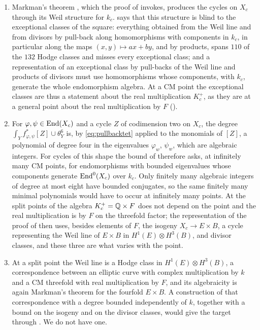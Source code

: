 \begin{remark}\label{rem:cmsource}
\leavevmode
\begin{enumerate}[label=\textup{(\arabic*)},leftmargin=2.6em,itemsep=3pt]
\item Markman's theorem \cite{Mar25a}, which the proof of
   invokes, produces the cycles on $X_{c}$ through its
  Weil structure for $k_{c}$.  says that this structure
  is blind to the exceptional classes of the square: everything obtained
  from the Weil line and from divisors by pull-back along homomorphisms with
  components in $k_{c}$, in particular along the maps $(x,y)\mapsto ax+by$,
  and by products, spans $110$ of the $132$ Hodge classes and misses every
  exceptional class; and a representation of an exceptional class by
  pull-backs of the Weil line and products of divisors must use
  homomorphisms whose components, with $k_{c}$, generate the whole
  endomorphism algebra. At a CM point the exceptional classes are thus a
  statement about the real multiplication $K_{c}^{+}$, as they are at a
  general point about the real multiplication by $F$
  ().
\item For $\varphi,\psi\in\operatorname{End}(X_{c})$ and a cycle $Z$ of codimension two on
  $X_{c}$, the degree $\int_{Y}f_{\varphi,\psi}^{*}[Z]\cup\theta_{Y}^{6}$
  is, by \eqref{eq:pullbacktet} applied to the monomials of $[Z]$, a
  polynomial of degree four in the eigenvalues $\varphi_{w}$, $\psi_{w}$,
  which are algebraic integers. For cycles of this shape the bound of
   therefore asks, at infinitely many CM points,
  for endomorphisms with bounded eigenvalues whose components generate
  $\operatorname{End}^{0}(X_{c})$ over $k_{c}$. Only finitely many algebraic integers of
  degree at most eight have bounded conjugates, so the same finitely many
  minimal polynomials would have to occur at infinitely many points. At
  the split points of  the algebra $K_{c}^{+}=\mathbb{Q}\times F$
  does not depend on the point and the real multiplication is by $F$ on the
  threefold factor; the representation of the proof of 
  then uses, besides elements of $F$, the isogeny $X_{c}\to E\times B$, a
  cycle representing the Weil line of $E\times B$ in
  $H^{1}(E)\otimes H^{3}(B)$, and divisor classes, and these three are what
  varies with the point.
\item At a split point the Weil line is a Hodge class in $H^{1}(E)\otimes
  H^{3}(B)$, a correspondence between an elliptic curve with complex
  multiplication by $k$ and a CM threefold with real multiplication by $F$,
  and its algebraicity is again Markman's theorem for the fourfold
  $E\times B$. A construction of that correspondence with a degree bounded
  independently of $k$, together with a bound on the isogeny and on the
  divisor classes, would give the target through .
  We do not have one.
\end{enumerate}
\end{remark}


